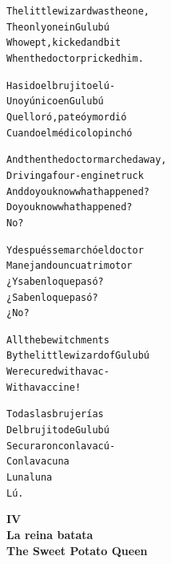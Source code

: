 \documentclass[11pt,a4paper]{article}
\begin{document}
\begin{parcolumns}{2}
\colplacechunks

\colchunk
{
\begin{alltt}\normalfont
The little wizard was the one,
The only one in Gulubú
Who wept, kicked and bit
When the doctor pricked him.
\end{alltt}
}

\colchunk
{
\begin{alltt}\normalfont
Ha sido el brujito el ú-
Uno y único en Gulubú
Que lloró, pateó y mordió
Cuando el médico lo pinchó
\end{alltt}
}

\colplacechunks

\colchunk
{
\begin{alltt}\normalfont
And then the doctor marched away,
Driving a four-engine truck
And do you know what happened?
Do you know what happened?
No?
\end{alltt}
}

\colchunk
{
\begin{alltt}\normalfont
Y después se marchó el doctor
Manejando un cuatrimotor
¿Y saben lo que pasó?
¿Saben lo que pasó?
¿No?
\end{alltt}
}

\colplacechunks

\colchunk
{
\begin{alltt}\normalfont
All the bewitchments
By the little wizard of Gulubú
Were cured with a vac-
With a vaccine!
\end{alltt}
}

\colchunk
{
\begin{alltt}\normalfont
Todas las brujerías
Del brujito de Gulubú
Se curaron con la vacú-
Con la vacuna
Luna luna
Lú.
\end{alltt}
}

\colplacechunks

\end{parcolumns}

\clearpage

\begin{center}
\large\textbf{
IV\\
La reina batata\\
The Sweet Potato Queen
}
\end{center}
\end{document}
